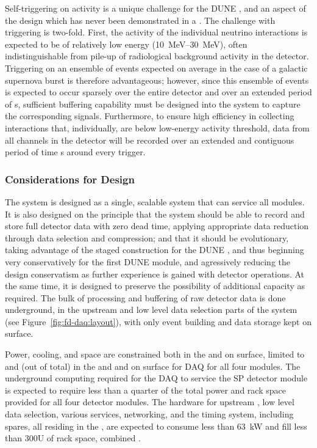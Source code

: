 Self-triggering on  activity is a unique challenge for the
DUNE , and an aspect of the design which has never been demonstrated
in a . The challenge with  triggering is two-fold. 
First, the activity of the individual  neutrino interactions
is expected to be of relatively low energy (\SIrange{10}{30}{\mega\electronvolt}),
often indistinguishable from pile-up of radiological background activity in the
detector.  Triggering on an ensemble of  events expected on
average in the case of a galactic supernova burst is therefore
advantageous; however, since this ensemble of events is expected to occur sparsely over the
entire detector and over an extended period of \si{s},
sufficient buffering capability must be designed into the system to
capture the corresponding signals. 
Furthermore, to ensure high efficiency in collecting  interactions
that, individually, are below low-energy activity threshold, data from
all channels in the detector will be recorded over an extended and contiguous period of
time \si{s} around every  trigger.

 

\subsubsection{Considerations for Design}
\label{sec:fd-daq:considerations}

The  system is designed as a single, scalable system that can
service all  modules. It is also designed on the principle that the
system should be able to record and store full detector data with zero dead
time, applying appropriate data reduction through data selection and
compression; and that it should be evolutionary, taking advantage of the
staged construction for the DUNE , and thus beginning very
conservatively for the first DUNE  module, and agressively reducing
the design conservatism as further experience is gained with detector
operations. At the same time, it is designed to preserve the possibility of
additional capacity as required. The bulk of processing and buffering of raw
detector data is done underground, in the upstream  and low
level data selection parts of the
system (see Figure~\ref{fig:fd-daq:layout}), with only event building and data
storage kept on surface.

Power, cooling, and space are constrained both in the  and on surface, limited to \daqpower and \daqracks (out of \cucracks total) in the  and \surfdaqpower and \surfdaqracks on surface for DAQ for all four  modules.
The underground computing required for the DAQ to service the SP detector module is expected to require less than a quarter of the total power and rack space provided for all four detector modules. 
The hardware for upstream , low level data selection,
various services, networking, and the timing system, including spares,
all residing in the , 
are expected to consume less than \SI{63}{\kilo\watt} and fill less
than 300U of rack space, combined \cite{ale}.

